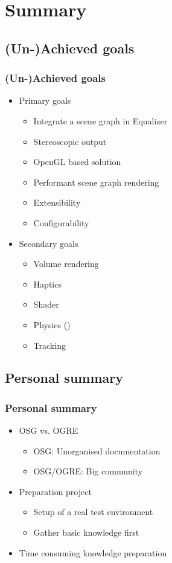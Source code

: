 \section{Summary}

\subsection{(Un-)Achieved goals}
\begin{frame}\frametitle{(Un-)Achieved goals}
	\begin{itemize}
		\item<1-> Primary goals
		\begin{itemize}
			\item Integrate a scene graph in Equalizer \tick
			\item Stereoscopic output \tick
			\item OpenGL based solution \tick
			\item Performant scene graph rendering \tick
			\item Extensibility \tick
			\item Configurability \tick
		\end{itemize}
		\item<2-> Secondary goals
		\begin{itemize}
			\item Volume rendering \cross
			\item Haptics \cross
			\item Shader \tick
			\item Physics (\tick)
			\item Tracking \cross
		\end{itemize}
	\end{itemize}
\end{frame}

\subsection{Personal summary}

\begin{frame}\frametitle{Personal summary}
	\begin{itemize}
		\item<1-> OSG vs. OGRE
		\begin{itemize}
			\item OSG: Unorganised documentation
			\item OSG/OGRE: Big community
		\end{itemize}
		\item<2-> Preparation project
		\begin{itemize}
			\item Setup of a real test environment
			\item Gather basic knowledge first
		\end{itemize}
		\item<3-> Time consuming knowledge preparation
	\end{itemize}
\end{frame}
